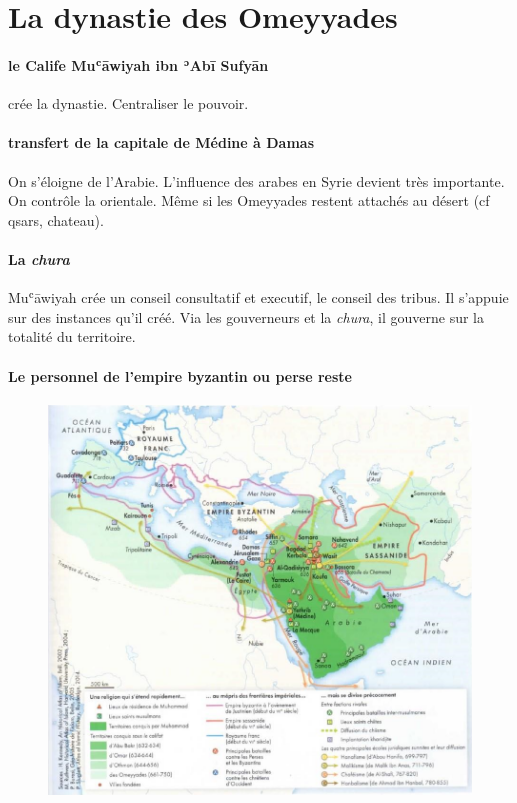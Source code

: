 \section{La dynastie des Omeyyades}


\paragraph{le Calife  Muʿāwiyah ibn ʾAbī Sufyān} crée la dynastie. Centraliser le pouvoir. 

\paragraph{transfert de la capitale de Médine à Damas} On s'éloigne de l'Arabie. L'influence des arabes en Syrie devient très importante. On contrôle la \Med orientale. Même si les Omeyyades restent attachés au désert (cf qsars, chateau).

\paragraph{La \textit{chura}} Muʿāwiyah crée un conseil consultatif et executif, le conseil des tribus. Il s'appuie sur des instances qu'il créé. Via les gouverneurs et la \textit{chura}, il gouverne sur la totalité du territoire.

\paragraph{Le personnel de l'empire byzantin ou perse reste} 



\begin{figure}[h!]
    \centering
   \includegraphics[width=\textwidth]{HistoireIslamMediterranee/Images/ExpansionMusulmane.png}
  
    \label{fig:my_label}
\end{figure}
